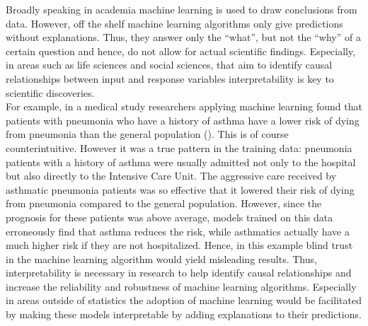 \documentclass[
]{krantz}
\begin{document}
Broadly speaking in academia machine learning is used to draw conclusions from data. However, off the shelf machine learning algorithms only give predictions without explanations. Thus, they answer only the ``what'', but not the ``why'' of a certain question and hence, do not allow for actual scientific findings. Especially, in areas such as life sciences and social sciences, that aim to identify causal relationships between input and response variables interpretability is key to scientific discoveries.\\
For example, in a medical study researchers applying machine learning found that patients with pneumonia who have a history of asthma have a lower risk of dying from pneumonia than the general population (\citet{caruana2015intelligible}). This is of course counterintuitive. However it was a true pattern in the training data: pneumonia patients with a history of asthma were usually admitted not only to the hospital but also directly to the Intensive Care Unit. The aggressive care received by asthmatic pneumonia patients was so effective that it lowered their risk of dying from pneumonia compared to the general population. However, since the prognosis for these patients was above average, models trained on this data erroneously find that asthma reduces the risk, while asthmatics actually have a much higher risk if they are not hospitalized. Hence, in this example blind trust in the machine learning algorithm would yield misleading results.
Thus, interpretability is necessary in research to help identify causal relationships and increase the reliability and robustness of machine learning algorithms. Especially in areas outside of statistics the adoption of machine learning would be facilitated by making these models interpretable by adding explanations to their predictions.
\end{document}
